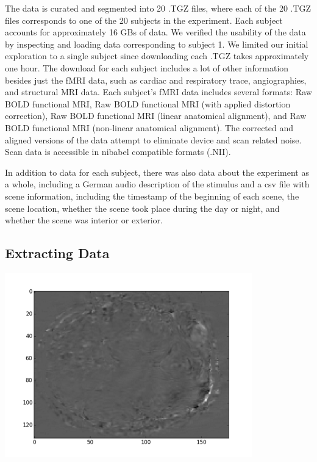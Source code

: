 \documentclass[11pt]{article}
\begin{document}
The data is curated and segmented into 20 .TGZ files, where each of the 20
.TGZ  files corresponds to one of the 20 subjects in the experiment. Each
subject  accounts for approximately 16 GBs of data. We verified the usability
of the data by inspecting and loading data corresponding to subject 1. We
limited our initial exploration to a single subject since downloading each
.TGZ takes  approximately one hour.  The download for each subject includes a
lot of other information besides just the fMRI data, such as cardiac and
respiratory trace, angiographies, and structural MRI data. Each subject's fMRI
data includes several formats: Raw BOLD functional MRI, Raw BOLD functional
MRI (with applied distortion correction), Raw BOLD functional MRI (linear
anatomical alignment), and Raw BOLD functional MRI (non-linear anatomical
alignment). The corrected and aligned versions of the data attempt to
eliminate device and scan related noise. Scan data is accessible in nibabel
compatible formats (.NII).

In addition to data for each subject, there was also data about the
experiment as a whole, including a German audio description of the stimulus
and a csv file with scene information, including the timestamp of the
beginning of each scene, the scene location, whether the scene took place
during the day or night, and whether the scene was interior or exterior.  

\subsection{Extracting Data} 
\begin{center}                                                                  
\includegraphics[height=8cm]{1}                                                 
\end{center}                                                                    
                                                                                
\end{document}
